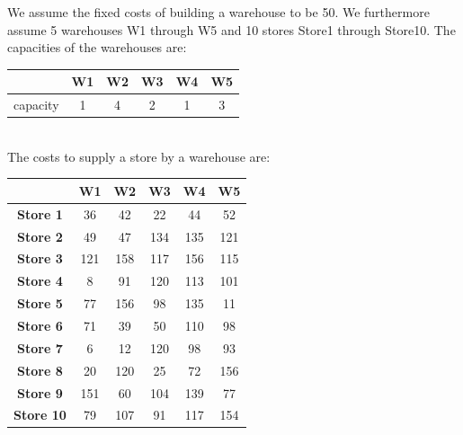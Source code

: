 \documentclass[a4paper]{scrartcl}
\begin{document}
We assume the fixed costs of building a warehouse to be 50. We 
furthermore assume 5 warehouses W1 through W5 and 10 stores Store1 
through Store10. The capacities of the warehouses are:\\[1.0cm]
\label{cap}
\begin{tabular}{||c|c|c|c|c|c||}
\hline
& {\bf W1} & {\bf W2} & {\bf W3} & {\bf W4} &{\bf W5}\\
\hline
capacity  & 1 & 4 & 2 &1 & 3\\
\hline
\end{tabular}\\[1.0cm]

The costs to supply a store by a warehouse are:\\[1.0cm]
\begin{tabular}{||c|c|c|c|c|c||}
\hline
& {\bf W1} & {\bf W2} & {\bf W3} & {\bf W4} &{\bf W5}\\
\hline
{\bf Store 1}& 36 & 42 & 22 & 44 & 52\\
\hline
{\bf Store 2}& 49 & 47 & 134 & 135 & 121\\ 
\hline
{\bf Store 3}& 121 & 158 & 117 & 156 & 115\\
\hline
{\bf Store 4}& 8 & 91 & 120 & 113 & 101\\
\hline
{\bf Store 5}& 77 & 156 & 98 & 135 & 11\\
\hline
{\bf Store 6}& 71 & 39 & 50 & 110 & 98\\
\hline
{\bf Store 7}& 6 & 12 & 120 & 98 & 93\\
\hline
{\bf Store 8}& 20 & 120 & 25 & 72 & 156\\
\hline
{\bf Store 9}& 151 & 60 & 104 & 139 & 77\\
\hline
{\bf Store 10}& 79 & 107 & 91 & 117 & 154\\
\hline
\end{tabular}\\[1.0cm]
\end{document}
